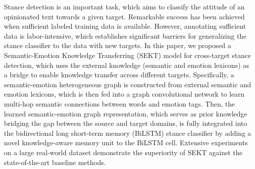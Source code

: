 Stance detection is an important task, which aims to classify the attitude of an opinionated text towards a given target. Remarkable success has been achieved when sufficient labeled training data is available. However, annotating sufficient data is labor-intensive, which establishes significant barriers for generalizing the stance classifier to the data with new targets.  In this paper, we proposed a Semantic-Emotion Knowledge Transferring (SEKT) model for cross-target stance detection, which uses the external knowledge (semantic and emotion lexicons) as a bridge to enable knowledge transfer across different targets.  Specifically, a semantic-emotion heterogeneous graph is constructed from external semantic and emotion lexicons, which is then fed into a graph convolutional network to learn multi-hop semantic connections between words and emotion tags. Then, the learned semantic-emotion graph representation, which serves as prior knowledge bridging the gap between the source and target domains, is fully integrated into the bidirectional long short-term memory (BiLSTM) stance classifier by adding a novel knowledge-aware memory unit to the BiLSTM cell. Extensive experiments on a large real-world dataset demonstrate the superiority of SEKT against the state-of-the-art baseline methods.
